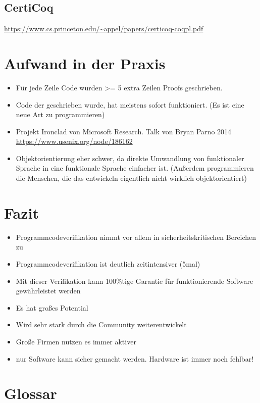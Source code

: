 \subsection{CertiCoq}
\url{https://www.cs.princeton.edu/~appel/papers/certicoq-coqpl.pdf}

\section{Aufwand in der Praxis}
\begin{itemize}
	\item Für jede Zeile Code wurden >= 5 extra Zeilen Proofs geschrieben.
	\item Code der geschrieben wurde, hat meistens sofort funktioniert. (Es ist eine neue Art zu programmieren)
	\item Projekt Ironclad von Microsoft Research. Talk von Bryan Parno 2014 \url{https://www.usenix.org/node/186162}
	\item Objektorientierung eher schwer, da direkte Umwandlung von funktionaler Sprache in eine funktionale Sprache einfacher ist. (Außerdem programmieren die Menschen, die das entwickeln eigentlich nicht wirklich objektorientiert)
\end{itemize}


\section{Fazit}
\begin{itemize}
	\item Programmcodeverifikation nimmt vor allem in sicherheitskritischen Bereichen zu
	\item Programmcodeverifikation ist deutlich zeitintensiver (5mal)
	\item Mit dieser Verifikation kann 100\%tige Garantie für funktionierende Software gewährleistet werden
	\item Es hat großes Potential
	\item Wird sehr stark durch die Community weiterentwickelt
	\item Große Firmen nutzen es immer aktiver
	\item nur Software kann sicher gemacht werden. Hardware ist immer noch fehlbar!
\end{itemize}

\section{Glossar}


